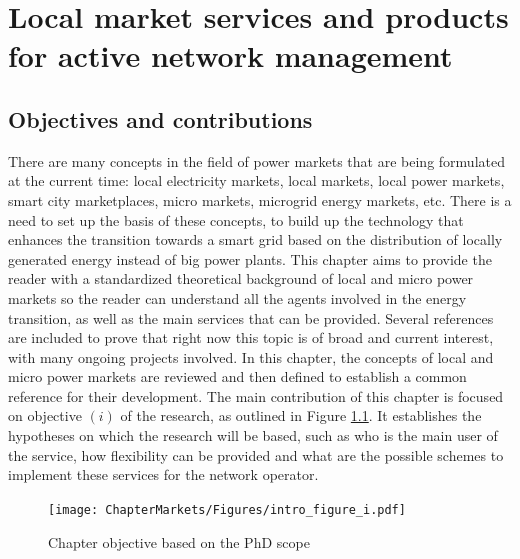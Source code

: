 \renewcommand\labelenumi{(\roman{enumi})}
\renewcommand\theenumi\labelenumi

\chapter{Local market services and products for active network management}
\label{chapterMarkets}

\section{Objectives and contributions}
There are many concepts in the field of power markets that are being formulated at the current time: local electricity markets, local markets, local power markets, smart city marketplaces, micro markets, microgrid energy markets, etc. There is a need to set up the basis of these concepts, to build up the technology that enhances the transition towards a smart grid based on the distribution of locally generated energy instead of big power plants.
This chapter aims to provide the reader with a standardized theoretical background of local and micro power markets so the reader can understand all the agents involved in the energy transition, as well as the main services that can be provided. Several references are included to prove that right now this topic is of broad and current interest, with many ongoing projects involved. In this chapter, the concepts of local and micro power markets are reviewed and then defined to establish a common reference for their development. 
The main contribution of this chapter is focused on objective $(i)$ of the research, as outlined in Figure \ref{fig:chapter_obj_i}. It establishes the hypotheses on which the research will be based, such as who is the main user of the service, how flexibility can be provided and what are the possible schemes to implement these services for the network operator.

\begin{figure}[htbp]
	\centering
	\texttt{[image: ChapterMarkets/Figures/intro\_figure\_i.pdf]}
		\caption{Chapter objective based on the PhD scope}
	\label{fig:chapter_obj_i}  
\end{figure}

